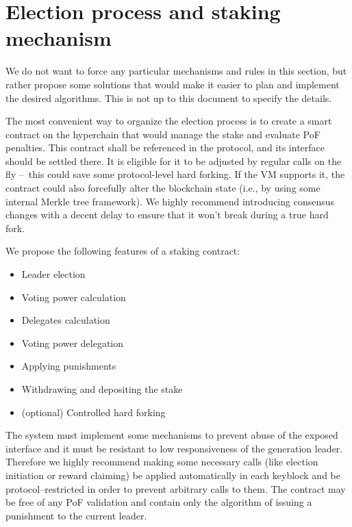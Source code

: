 \section{Election process and staking mechanism}

We do not want to force any particular mechanisms and rules in this section, but
rather propose some solutions that would make it easier to plan and implement
the desired algorithms. This is not up to this document to specify the details.

The most convenient way to organize the election process is to create a smart
contract on the hyperchain that would manage the stake and evaluate PoF
penalties. This contract shall be referenced in the protocol, and its interface
should be settled there. It is eligible for it to be adjusted by regular calls on the fly
– this could save some protocol-level hard forking. If the VM supports it, the
contract could also forcefully alter the blockchain state (i.e., by using some
internal Merkle tree framework). We highly recommend introducing consensus
changes with a decent delay to ensure that it won't break during a true hard fork.

We propose the following features of a staking contract:
\begin{itemize}
\item Leader election
\item Voting power calculation
\item Delegates calculation
\item Voting power delegation
\item Applying punishments
\item Withdrawing and depositing the stake
\item (optional) Controlled hard forking
\end{itemize}

The system must implement some mechanisms to prevent abuse of the exposed
interface and it must be resistant to low responsiveness
of the generation leader. Therefore we highly recommend making some necessary
calls (like election initiation or reward claiming) be applied automatically
in each keyblock and be protocol–restricted in order to prevent
arbitrary calls to them. The contract may be free of any PoF validation and
contain only the algorithm of issuing a punishment to the current leader.
